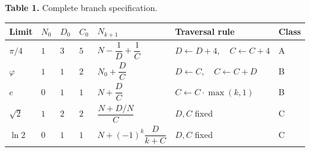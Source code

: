 \documentclass[
  11pt,
  letterpaper,
]{article}
\begin{document}
\textbf{Table 1.} Complete branch specification.

\begin{longtable}[]{@{}
  >{\raggedright\arraybackslash}p{}
  >{\raggedright\arraybackslash}p{}
  >{\raggedright\arraybackslash}p{}
  >{\raggedright\arraybackslash}p{}
  >{\raggedright\arraybackslash}p{}
  >{\raggedright\arraybackslash}p{}
  >{\raggedright\arraybackslash}p{}@{}}
\toprule\noalign{}
\begin{minipage}[b]{\linewidth}\raggedright
Limit
\end{minipage} & \begin{minipage}[b]{\linewidth}\raggedright
\(N_0\)
\end{minipage} & \begin{minipage}[b]{\linewidth}\raggedright
\(D_0\)
\end{minipage} & \begin{minipage}[b]{\linewidth}\raggedright
\(C_0\)
\end{minipage} & \begin{minipage}[b]{\linewidth}\raggedright
\(N_{k+1}\)
\end{minipage} & \begin{minipage}[b]{\linewidth}\raggedright
Traversal rule
\end{minipage} & \begin{minipage}[b]{\linewidth}\raggedright
Class
\end{minipage} \\
\midrule\noalign{}
\endhead
\bottomrule\noalign{}
\endlastfoot
\(\pi/4\) & \(1\) & \(3\) & \(5\) & \(N - \dfrac{1}{D} + \dfrac{1}{C}\)
& \(D \leftarrow D+4,\quad C \leftarrow C+4\) & A \\
\(\varphi\) & \(1\) & \(1\) & \(2\) & \(N_0 + \dfrac{D}{C}\) &
\(D \leftarrow C,\quad C \leftarrow C + D\) & B \\
\(e\) & \(0\) & \(1\) & \(1\) & \(N + \dfrac{D}{C}\) &
\(C \leftarrow C \cdot \max(k,1)\) & B \\
\(\sqrt{2}\) & \(1\) & \(2\) & \(2\) & \(\dfrac{N + D/N}{C}\) & \(D, C\)
fixed & C \\
\(\ln 2\) & \(0\) & \(1\) & \(1\) & \(N + (-1)^k \dfrac{D}{k + C}\) &
\(D, C\) fixed & C \\
\end{longtable}
\end{document}
